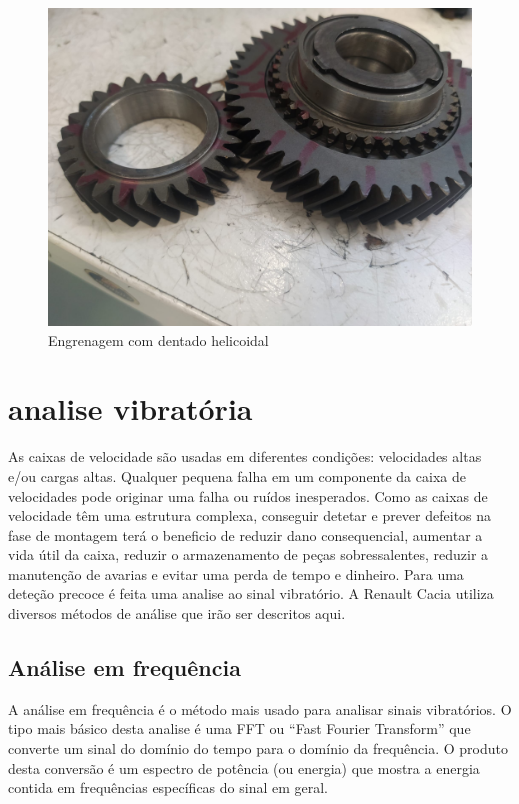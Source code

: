 \begin{figure}[H]
\centering
\includegraphics[scale=0.1]{figs/dentado_heli}
\caption{Engrenagem com dentado helicoidal}\label{dentado_helicoidal}
\end{figure}


\section{analise vibratória}
As caixas de velocidade são usadas em diferentes condições: velocidades altas e/ou cargas altas. Qualquer pequena falha em um componente da caixa de velocidades pode originar uma falha ou ruídos inesperados. Como as caixas de velocidade têm uma estrutura complexa, conseguir detetar e prever defeitos na fase de montagem terá o beneficio de reduzir dano consequencial, aumentar a vida útil da caixa, reduzir o armazenamento de peças sobressalentes, reduzir a manutenção de avarias e evitar uma perda de tempo e dinheiro. Para uma deteção precoce é feita uma analise ao sinal vibratório. A Renault Cacia utiliza diversos métodos de análise que irão ser descritos aqui.


\subsection{Análise em frequência}
A análise em frequência é o método mais usado para analisar sinais vibratórios. O tipo mais básico desta analise é uma FFT ou ``Fast Fourier Transform'' que converte um sinal do domínio do tempo para o domínio da frequência. O produto desta conversão é um espectro de potência (ou energia) que mostra a energia contida em frequências específicas do sinal em geral.

